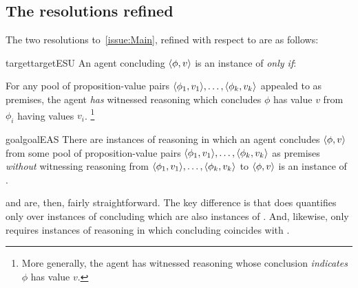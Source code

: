 \subsection{The resolutions refined}
\label{sec:two-resolutions}

\begin{note}
  The two resolutions to~\autoref{issue:Main}, refined with respect to  are as follows:
\end{note}

\begin{note}
  \begin{restatable}{target}{targetESU}
    \label{denied-claim}
    An agent concluding \(\langle \phi, v \rangle\) is an instance of \zS{} \emph{only if}:

    For any pool of proposition-value pairs \(\langle \phi_{1}, v_{1} \rangle,\dots,\langle \phi_{k}, v_{k} \rangle\) appealed to as premises, the agent \emph{has} witnessed reasoning which concludes \(\phi\) has value \(v\) from \(\phi_{i}\) having values \(v_{i}\).%
    \footnote{More generally, the agent has witnessed reasoning whose conclusion \emph{indicates} \(\phi\) has value \(v\).}
  \end{restatable}
\end{note}

\begin{note}
  \begin{restatable}{goal}{goalEAS}
    \label{prop:EAS}
    There are instances of reasoning in which an agent concludes \(\langle \phi, v \rangle\) from some pool of proposition-value pairs \(\langle \phi_{1}, v_{1} \rangle,\dots,\langle \phi_{k}, v_{k} \rangle\) as premises \emph{without} witnessing reasoning from \(\langle \phi_{1}, v_{1} \rangle,\dots,\langle \phi_{k}, v_{k} \rangle\) to \(\langle \phi, v \rangle\) is an instance of \zS{}.
  \end{restatable}
\end{note}

\begin{note}
  \ESU{} and \EAS{} are, then, fairly straightforward.
  The key difference is that \ESU{} does quantifies only over instances of concluding which are also instances of .
  And, likewise, \EAS{} only requires instances of reasoning in which concluding coincides with .
\end{note}

